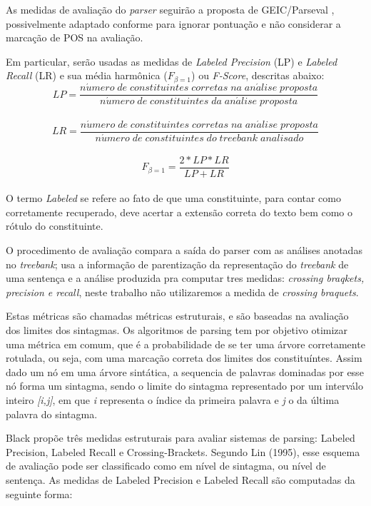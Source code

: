 As medidas de avaliação do \emph{parser} seguirão a proposta de GEIC/Parseval \cite{black91}, possivelmente adaptado conforme \cite{collins97} para ignorar pontuação e não considerar a marcação de POS na avaliação. 

Em particular, serão usadas as medidas de \emph{Labeled Precision} (LP) e \emph{Labeled Recall} (LR) e sua média harmônica ($F_{\beta=1}$) ou \emph{F-Score}, descritas abaixo:
\\
$$LP = \frac{n\acute{u}mero\; de\; constituintes\; corretas\; na\; an\acute{a}lise\; proposta}{n\acute{u}mero\; de\; constituintes\; da\; an\acute{a}lise\; proposta}$$
\\
$$LR = \frac{n\acute{u}mero\; de\; constituintes\; corretas\; na\; an\acute{a}lise\; proposta}{n\acute{u}mero\; de\; constituintes\; do\; \mathit{treebank}\; analisado}$$
\\
$$F_{\beta=1} = \frac{2*LP*LR}{LP+LR}$$
\\
O termo \emph{Labeled} se refere ao fato de que uma constituinte, para contar como corretamente recuperado, deve acertar a extensão correta do texto bem como o rótulo do constituinte.

O procedimento de avaliação compara a saída do parser com as análises anotadas no \emph{treebank}; usa a informação de parentização da representação do \emph{treebank} de uma sentença e a análise produzida pra computar tres medidas: \emph{crossing braqkets, precision e recall}, neste trabalho não utilizaremos a medida de \emph{crossing braquets}.

Estas métricas são chamadas métricas estruturais, e são baseadas na avaliação dos limites dos sintagmas. Os algoritmos de parsing tem por objetivo otimizar uma métrica em comum, que é a probabilidade de se ter uma árvore corretamente rotulada, ou seja, com uma marcação correta dos limites dos constituíntes. Assim dado um nó em uma árvore sintática, a sequencia de palavras dominadas por esse nó forma um sintagma, sendo o limite do sintagma representado por um interválo inteiro \emph{[i,j]}, em que \emph{i} representa o índice da primeira palavra e \emph{j} o da última palavra do sintagma.

Black \cite{black91} propõe três medidas estruturais para avaliar sistemas de parsing: Labeled Precision, Labeled Recall e Crossing-Brackets. Segundo Lin (1995), esse esquema de avaliação pode ser classificado como em nível de sintagma, ou nível de sentença. 
As medidas de Labeled Precision e Labeled Recall são computadas da seguinte forma:

